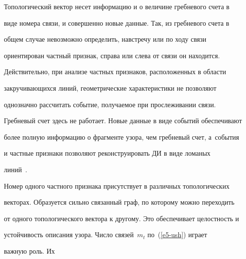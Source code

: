   Топологический вектор несет информацию и о величине гребневого счета в 


виде номера связи, и совершенно новые данные. Так, из гребневого счета в 


общем случае невозможно определить, навстречу или по ходу связи 


ориентирован частный признак, справа или слева от связи он находится. 


Действительно, при анализе частных признаков, расположенных в области 


закручивающихся линий, геометрические характеристики не позволяют 


однозначно рассчитать событие, получаемое при прослеживании связи. 


Гребневый счет здесь не работает. Новые данные в виде событий обеспечивают 


более полную информацию о фрагменте узора, чем гребневый счет, а~события 


и частные признаки позволяют реконструировать ДИ в виде ломаных 


линий~\cite{8-ush}.








  


  Номер одного частного признака присутствует в различных топологических 


векторах. Образуется сильно связанный граф, по которому можно переходить 


от одного топологического вектора к другому. Это обеспечивает целостность и 


устойчивость описания узора. Число связей~$m_t$ по~(\ref{e5-ush}) играет 


важную роль. Их\linebreak\vspace*{-12pt}







